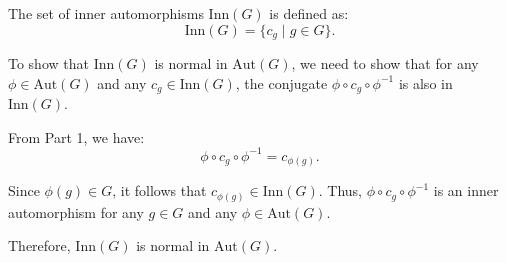 \documentclass[12pt]{amsart}
\theoremstyle{definition}
\numberwithin{equation}{section}
\begin{document}
\begin{exercise}{2}
    The set of inner automorphisms \(\text{Inn}(G)\) is defined as:
    \[
    \text{Inn}(G) = \{ c_g \mid g \in G \}.
    \]

    To show that \(\text{Inn}(G)\) is normal in \(\text{Aut}(G)\), we need to show that for any \(\phi \in \text{Aut}(G)\) and any \(c_g \in \text{Inn}(G)\), the conjugate \(\phi \circ c_g \circ \phi^{-1}\) is also in \(\text{Inn}(G)\).

    From Part 1, we have:
    \[
    \phi \circ c_g \circ \phi^{-1} = c_{\phi(g)}.
    \]

    Since \(\phi(g) \in G\), it follows that \(c_{\phi(g)} \in \text{Inn}(G)\). Thus, \(\phi \circ c_g \circ \phi^{-1}\) is an inner automorphism for any \(g \in G\) and any \(\phi \in \text{Aut}(G)\).

    Therefore, \(\text{Inn}(G)\) is normal in \(\text{Aut}(G)\).
\end{exercise}
\newpage
\end{document}
